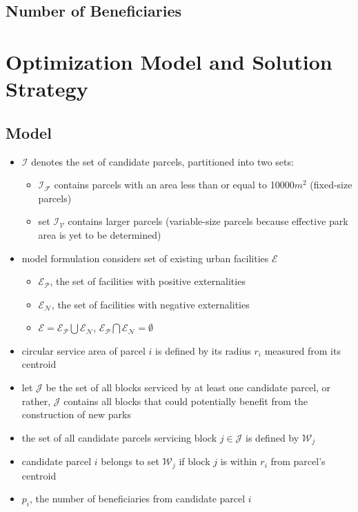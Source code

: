 \documentclass{article}
\begin{document}
\subsection{Number of Beneficiaries}


%
%
\section{Optimization Model and Solution Strategy}
\subsection{Model}
\begin{itemize}
\item $\mathcal{I}$ denotes the set of candidate parcels, partitioned into two sets:
	\begin{itemize}
	\item $\mathcal{I_F}$ contains parcels with an area less than or equal to 10000$m^2$ (fixed-size parcels)
	\item set $\mathcal{I_V}$ contains larger parcels (variable-size parcels because effective park area is yet to be determined)
	\end{itemize}
\item model formulation considers set of existing urban facilities $\mathcal{E}$
	\begin{itemize}
	\item $\mathcal{E_P}$, the set of facilities with positive externalities
	\item $\mathcal{E_N}$, the set of facilities with negative externalities
	\item $\mathcal{E} = \mathcal{E_P} \bigcup \mathcal{E_N}$, $\mathcal{E_P} \bigcap \mathcal{E_N} =  \emptyset$
	\end{itemize}
\item circular service area of parcel $i$ is defined by its radius $r_i$ measured from its centroid
\item let $\mathcal{J}$ be the set of all blocks serviced by at least one candidate parcel, or rather, $\mathcal{J}$ contains all blocks that could potentially benefit from the construction of new parks
\item the set of all candidate parcels servicing block $j \in \mathcal{J}$ is defined by $\mathcal{W}_j$
\item candidate parcel $i$ belongs to set $\mathcal{W}_j$ if block $j$ is within $r_i$ from parcel's centroid
\item $p_i$, the number of beneficiaries from candidate parcel $i$

\end{itemize}
\end{document}
